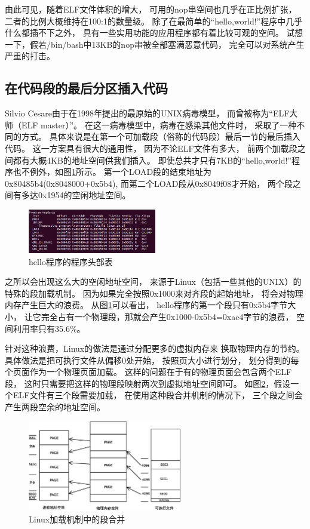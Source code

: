 由此可见，随着ELF文件体积的增大，
可用的nop串空间也几乎在正比例扩张，
二者的比例大概维持在100:1的数量级。
除了在最简单的“hello,world!”程序中几乎什么都插不下之外，
具有一些实用功能的应用程序都有着比较可观的空间。
试想一下，假若/bin/bash中13KB的nop串被全部塞满恶意代码，
完全可以对系统产生严重的打击。

\subsection{在代码段的最后分区插入代码}

Silvio Cesare由于在1998年提出的最原始的UNIX病毒模型，
而曾被称为“ELF大师（ELF master）”。
在这一病毒模型中，病毒在感染其他文件时，
采取了一种不同的方式。
具体来说是在第一个可加载段（俗称的代码段）最后一节的最后插入代码。
这一方案具有很大的通用性，
因为不论ELF文件有多大，
前两个加载段之间都有大概4KB的地址空间供我们插入。
即使总共才只有7KB的“hello,world!”程序也不例外，如图\ref{hello}所示。
第一个LOAD段的结束地址为0x80485b4(0x8048000+0x5b4),
而第二个LOAD段从0x8049f08才开始，
两个段之间有多达0x1954的空闲地址空间。

\begin{figure}[h!]
  \centering
  \includegraphics[width=0.5\textwidth]{figure/helloprograms.png}
  \caption{hello程序的程序头部表}
  \label{hello}
\end{figure}

之所以会出现这么大的空闲地址空间，
来源于Linux（包括一些其他的UNIX）的特殊的段加载机制。
因为如果完全按照0x1000来对齐段的起始地址，
将会对物理内存产生巨大的浪费。
从图\ref{hello}可以看出，
hello程序的第一个段只有0x5b4字节大小，
让它完全占有一个物理段，那就会产生0x1000-0x5b4=0xac4字节的浪费，
空间利用率只有35.6\%。


针对这种浪费，Linux的做法是通过分配更多的虚拟内存来
换取物理内存的节约。
具体做法是把可执行文件从偏移0处开始，
按照页大小进行划分，
划分得到的每个页面作为一个物理页面加载。
这样的问题在于有的物理页面会包含两个ELF段，
这时只需要把这样的物理段映射两次到虚拟地址空间即可。
如图\ref{linuxmap}，假设一个ELF文件有三个段需要加载，
在使用这种段合并机制的情况下，
三个段之间会产生两段空余的地址空间。


\begin{figure}[h!]
  \centering
  \includegraphics[width=0.6\textwidth]{figure/linuxmap.eps}
  \caption{Linux加载机制中的段合并}
  \label{linuxmap}
\end{figure}



